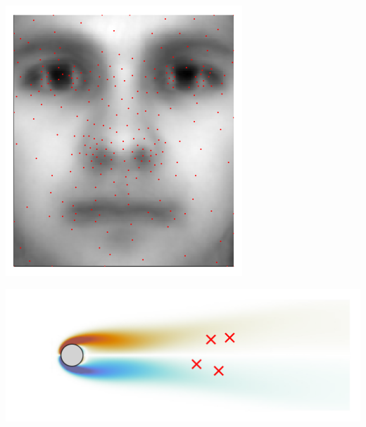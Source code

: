 \documentclass[aspectratio=169, usenames, dvipsnames]{beamer}
\begin{document}
{

\begin{frame}%
  \centering
  \vfill
  \includegraphics[height=.8\textheight]{mean_face_ter}
  \vfill
\end{frame}

\begin{frame}
  \centering
  \vfill

  \includegraphics[width=\textwidth]{mean_flow_sensors}

  \vfill
\end{frame}

}
\end{document}
